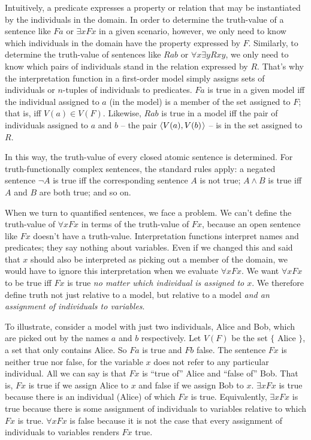 Intuitively, a predicate expresses a property or relation that may be
instantiated by the individuals in the domain. In order to determine the
truth-value of a sentence like $Fa$ or $\exists x Fx$ in a given scenario,
however, we only need to know which individuals in the domain have the property
expressed by $F$. Similarly, to determine the truth-value of sentences like
$Rab$ or $\forall x \exists y Rxy$, we only need to know which pairs of
individuals stand in the relation expressed by $R$. That's why the
interpretation function in a first-order model simply assigns sets of
individuals or $n$-tuples of individuals to predicates. $Fa$ is true in a given
model iff the individual assigned to $a$ (in the model) is a member of the set
assigned to $F$; that is, iff $V(a) \in V(F)$. Likewise, $Rab$ is true in a
model iff the pair of individuals assigned to $a$ and $b$ -- the pair
$\t{V(a),V(b)}$ -- is in the set assigned to $R$.

In this way, the truth-value of every closed atomic sentence is determined. For
truth-functionally complex sentences, the standard rules apply: a negated
sentence $\neg A$ is true iff the corresponding sentence $A$ is not true;
$A \land B$ is true iff $A$ and $B$ are both true; and so on.

When we turn to quantified sentences, we face a problem. We can't define the
truth-value of $\forall x Fx$ in terms of the truth-value of $Fx$, because an
open sentence like $Fx$ doesn't have a truth-value. Interpretation functions
interpret names and predicates; they say nothing about variables. Even if we
changed this and said that $x$ should also be interpreted as picking out a
member of the domain, we would have to ignore this interpretation when we
evaluate $\forall x Fx$. We want $\forall x Fx$ to be true iff $Fx$ is true
\emph{no matter which individual is assigned to $x$}. We therefore define truth
not just relative to a model, but relative to a model \emph{and an assignment of
  individuals to variables}.

To illustrate, consider a model with just two individuals, Alice and Bob, which
are picked out by the names $a$ and $b$ respectively. Let $V(F)$ be the set $\{$
Alice $\}$, a set that only contains Alice. So $Fa$ is true and $Fb$ false. The
sentence $Fx$ is neither true nor false, for the variable $x$ does not refer to
any particular individual. All we can say is that $Fx$ is ``true of'' Alice and
``false of'' Bob. That is, $Fx$ is true if we assign Alice to $x$ and false if
we assign Bob to $x$. $\exists x Fx$ is true because there is an individual
(Alice) of which $Fx$ is true. Equivalently, $\exists x Fx$ is true because
there is some assignment of individuals to variables relative to which $Fx$ is
true. $\forall x Fx$ is false because it is not the case that every assignment
of individuals to variables renders $Fx$ true.

